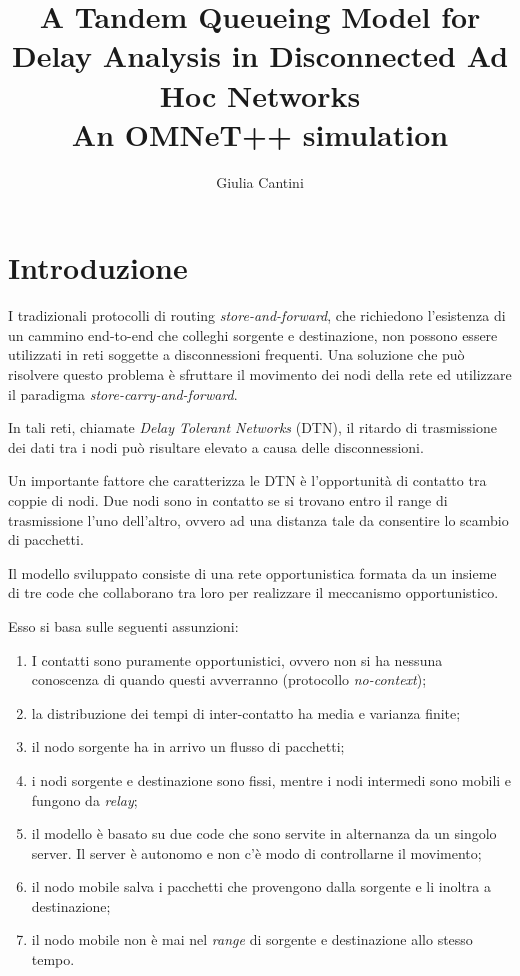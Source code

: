 \documentclass[a4paper,11pt]{article}
\begin{document}
\author{Giulia Cantini}
\title{A Tandem Queueing Model for Delay Analysis in Disconnected Ad Hoc Networks\\
\vspace{0.5cm}
\Large{An OMNeT++ simulation}}
\maketitle
\date

\tableofcontents

\section{Introduzione}
I tradizionali protocolli di routing \textit{store-and-forward}, che richiedono l'esistenza di un cammino
end-to-end che colleghi sorgente e destinazione, non possono essere utilizzati in reti
soggette a disconnessioni frequenti. Una soluzione che può risolvere questo problema è
sfruttare il movimento dei nodi della rete ed utilizzare il paradigma \textit{store-carry-and-forward}.

In tali reti, chiamate \textit{Delay Tolerant Networks} (DTN), il ritardo di trasmissione dei dati tra i nodi
può risultare elevato a causa delle disconnessioni.

Un importante fattore che caratterizza le DTN è l'opportunità di contatto tra coppie di nodi.
Due nodi sono in contatto se si trovano entro il range di trasmissione l'uno dell'altro,
ovvero ad una distanza tale da consentire lo scambio di pacchetti.

Il modello sviluppato consiste di una rete opportunistica formata da un insieme di tre code
che collaborano tra loro per realizzare il meccanismo opportunistico.

Esso si basa sulle seguenti assunzioni:

\begin{enumerate}
  \item I contatti sono puramente opportunistici, ovvero non si ha nessuna conoscenza
  di quando questi avverranno (protocollo \textit{no-context});
  \item la distribuzione dei tempi di inter-contatto ha media e varianza finite;
  \item il nodo sorgente ha in arrivo un flusso di pacchetti;
  \item i nodi sorgente e destinazione sono fissi, mentre i nodi intermedi sono mobili e
  fungono da \textit{relay};
  \item il modello è basato su due code che sono servite in alternanza da un singolo server.
  Il server è autonomo e non c'è modo di controllarne il movimento;
  \item il nodo mobile salva i pacchetti che provengono dalla sorgente e li inoltra a destinazione;
  \item il nodo mobile non è mai nel \textit{range} di sorgente e destinazione allo stesso tempo.

\end{enumerate}
\end{document}

